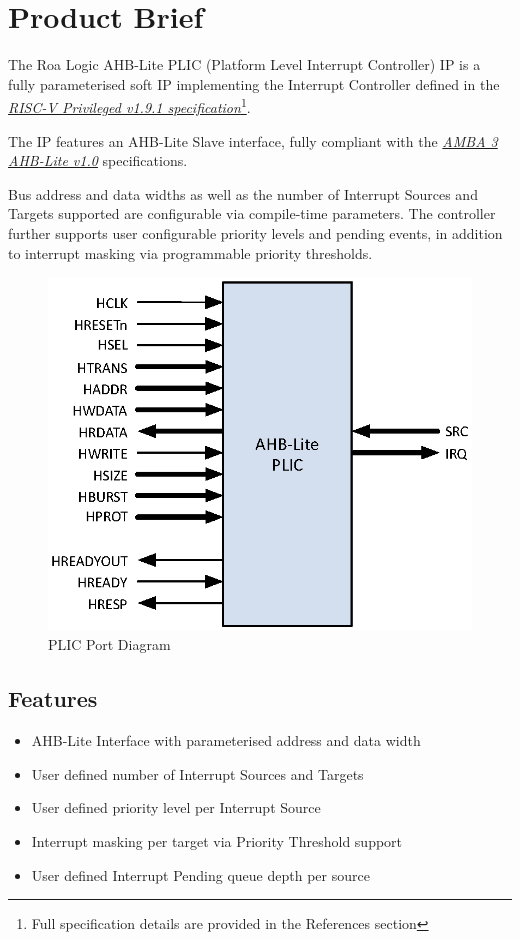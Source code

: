\chapter{Product Brief}

The Roa Logic AHB-Lite PLIC (Platform Level Interrupt Controller) IP is a fully parameterised soft IP implementing the Interrupt Controller defined in the \emph{\href{https://github.com/riscv/riscv-isa-manual/blob/master/release/riscv-privileged-v1.9.1.pdf}{RISC-V Privileged v1.9.1 specification}}\footnote{Full specification details are provided in the References section}.

The IP features an AHB-Lite Slave interface, fully compliant with the \emph{\href{https://www.arm.com/products/system-ip/amba-specifications}{AMBA 3 AHB-Lite v1.0}} specifications.

Bus address and data widths as well as the number of Interrupt Sources and Targets supported are configurable via compile-time parameters. The controller further supports user configurable priority levels and pending events, in addition to interrupt masking via programmable priority thresholds.

\begin{figure}[!htb]
  \includegraphics{assets/img/plic-ports}
  \caption{PLIC Port Diagram}
  \label{fig:PORTDIAG}
\end{figure}

\section{Features}

\begin{itemize}
	\item
		AHB-Lite Interface with parameterised address and data width
	\item
		User defined number of Interrupt Sources and Targets
	\item
		User defined priority level per Interrupt Source
	\item
		Interrupt masking per target via Priority Threshold support
	\item
		User defined Interrupt Pending queue depth per source
\end{itemize}

